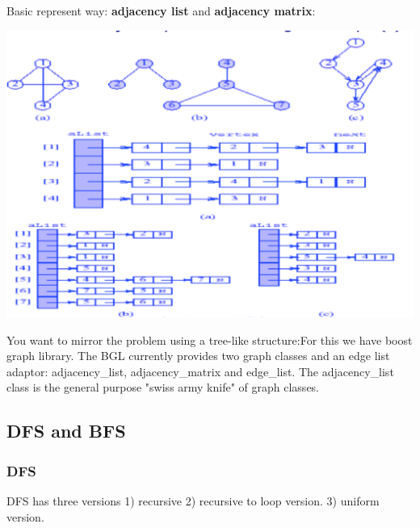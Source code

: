 \documentclass[a4paper,11pt,twoside]{book}
\begin{document}
	\par Basic represent way: \textbf{adjacency list} and \textbf{adjacency matrix}: 
\begin{center}
	\includegraphics[scale=0.6]{pics/adjacency.png}
\end{center}


	\par You want to mirror the problem using a tree-like structure:For this we have boost graph library. The BGL currently provides two graph classes and an edge list adaptor: adjacency\_list, adjacency\_matrix and edge\_list.  The adjacency\_list class is the general purpose "swiss army knife" of graph classes.


\subsection{DFS and BFS}
\subsubsection{DFS}

	\par DFS has three versions 1) recursive 2) recursive to loop version. 3) uniform version.
	
\end{document}
